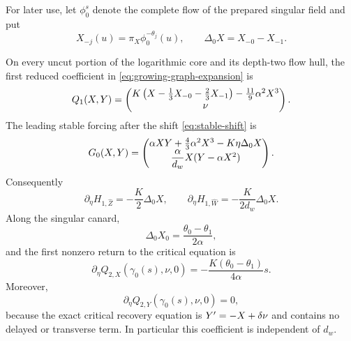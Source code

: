 For later use, let \(\phi_0^s\) denote the complete flow of the prepared
singular field and put
\begin{equation}
\label{eq:singular-backtracks}
 X_{-j}(u)=\pi_X\phi_0^{-\theta_j}(u),
 \qquad \Delta_0X=X_{-0}-X_{-1}.
\end{equation}

\begin{proposition}
\label{prop:transverse-return}
On every uncut portion of the logarithmic core and its depth-two flow hull,
the first reduced coefficient in \cref{eq:growing-graph-expansion} is
\begin{equation}
\label{eq:Q1}
 Q_1(X,Y)=\begin{pmatrix}
 K\left(X-\frac13X_{-0}-\frac23X_{-1}\right)
 -\frac{11}{9}\alpha^2X^3\\ \nu\end{pmatrix}.
\end{equation}
The leading stable forcing after the shift \cref{eq:stable-shift} is
\begin{equation}
\label{eq:G0}
 G_0(X,Y)=\begin{pmatrix}
 \alpha XY+\frac43\alpha^2X^3-K\eta\Delta_0X\\
 \dfrac{\alpha}{d_w}X(Y-\alpha X^2)\end{pmatrix}.
\end{equation}
Consequently
\begin{equation}
\label{eq:H1-eta}
 \partial_\eta H_{1,\widehat Z}=-\frac K2\Delta_0X,
 \qquad
 \partial_\eta H_{1,\widehat W}=-\frac{K}{2d_w}\Delta_0X.
\end{equation}
Along the singular canard,
\begin{equation}
\label{eq:delayed-canard-difference}
 \Delta_0X_0=\frac{\theta_0-\theta_1}{2\alpha},
\end{equation}
and the first nonzero return to the critical equation is
\begin{equation}
\label{eq:transverse-return-coefficient}
 \partial_\eta Q_{2,X}(\gamma_0(s),\nu,0)
 =-\frac{K(\theta_0-\theta_1)}{4\alpha}s.
\end{equation}
Moreover,
\begin{equation}
\label{eq:transverse-return-y-zero}
 \partial_\eta Q_{2,Y}(\gamma_0(s),\nu,0)=0,
\end{equation}
because the exact critical recovery equation is
\(Y'=-X+\delta\nu\) and contains no delayed or transverse term.
In particular this coefficient is independent of \(d_w\).
\end{proposition}

